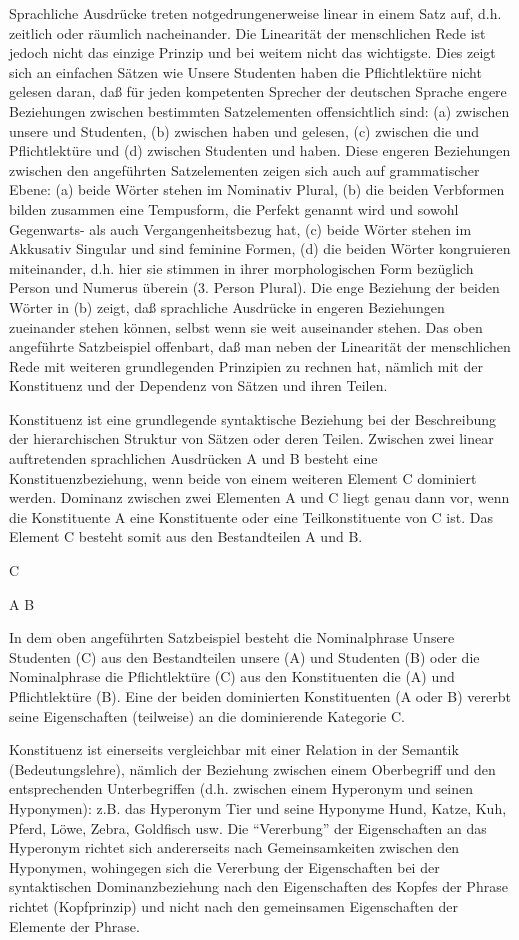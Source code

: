 \documentclass[
]{article}
\begin{document}
Sprachliche Ausdrücke treten notgedrungenerweise linear in einem Satz auf, d.h. zeitlich oder räumlich nacheinander. Die Linearität der menschlichen Rede ist jedoch nicht das einzige Prinzip und bei weitem nicht das wichtigste. Dies zeigt sich an einfachen Sätzen wie Unsere Studenten haben die Pflichtlektüre nicht gelesen daran, daß für jeden kompetenten Sprecher der deutschen Sprache engere Beziehungen zwischen bestimmten Satzelementen offensichtlich sind: (a) zwischen unsere und Studenten, (b) zwischen haben und gelesen, (c) zwischen die und Pflichtlektüre und (d) zwischen Studenten und haben. Diese engeren Beziehungen zwischen den angeführten Satzelementen zeigen sich auch auf grammatischer Ebene: (a) beide Wörter stehen im Nominativ Plural, (b) die beiden Verbformen bilden zusammen eine Tempusform, die Perfekt genannt wird und sowohl Gegenwarts- als auch Vergangenheitsbezug hat, (c) beide Wörter stehen im Akkusativ Singular und sind feminine Formen, (d) die beiden Wörter kongruieren miteinander, d.h. hier sie stimmen in ihrer morphologischen Form bezüglich Person und Numerus überein (3. Person Plural). Die enge Beziehung der beiden Wörter in (b) zeigt, daß sprachliche Ausdrücke in engeren Beziehungen zueinander stehen können, selbst wenn sie weit auseinander stehen. Das oben angeführte Satzbeispiel offenbart, daß man neben der Linearität der menschlichen Rede mit weiteren grundlegenden Prinzipien zu rechnen hat, nämlich mit der Konstituenz und der Dependenz von Sätzen und ihren Teilen.

Konstituenz ist eine grundlegende syntaktische Beziehung bei der Beschreibung der hierarchischen Struktur von Sätzen oder deren Teilen. Zwischen zwei linear auftretenden sprachlichen Ausdrücken A und B besteht eine Konstituenzbeziehung, wenn beide von einem weiteren Element C dominiert werden. Dominanz zwischen zwei Elementen A und C liegt genau dann vor, wenn die Konstituente A eine Konstituente oder eine Teilkonstituente von C ist. Das Element C besteht somit aus den Bestandteilen A und B.

C

A B

In dem oben angeführten Satzbeispiel besteht die Nominalphrase Unsere Studenten (C) aus den Bestandteilen unsere (A) und Studenten (B) oder die Nominalphrase die Pflichtlektüre (C) aus den Konstituenten die (A) und Pflichtlektüre (B). Eine der beiden dominierten Konstituenten (A oder B) vererbt seine Eigenschaften (teilweise) an die dominierende Kategorie C.

Konstituenz ist einerseits vergleichbar mit einer Relation in der Semantik (Bedeutungslehre), nämlich der Beziehung zwischen einem Oberbegriff und den entsprechenden Unterbegriffen (d.h. zwischen einem Hyperonym und seinen Hyponymen): z.B. das Hyperonym Tier und seine Hyponyme Hund, Katze, Kuh, Pferd, Löwe, Zebra, Goldfisch usw. Die ``Vererbung'' der Eigenschaften an das Hyperonym richtet sich andererseits nach Gemeinsamkeiten zwischen den Hyponymen, wohingegen sich die Vererbung der Eigenschaften bei der syntaktischen Dominanzbeziehung nach den Eigenschaften des Kopfes der Phrase richtet (Kopfprinzip) und nicht nach den gemeinsamen Eigenschaften der Elemente der Phrase.
\end{document}
